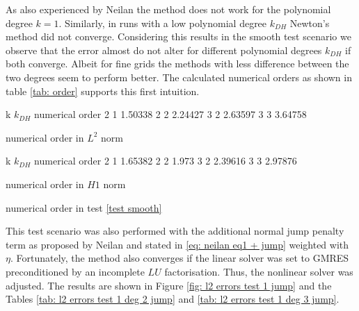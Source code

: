 As also experienced by Neilan the method does not work for the polynomial degree $k=1$. Similarly, in runs with a low polynomial degree $k_{DH}$ Newton's method did not converge.
Considering this results in the smooth test scenario we observe that the error almost do not alter for different polynomial degrees $k_{DH}$ if both converge. Albeit for fine grids the methods with less difference between the two degrees seem to perform better. The calculated numerical orders as shown in table \ref{tab: order} supports this first intuition.

\begin{table}[H]
\begin{subtable}[b]{0.45\textwidth}
\centering
	\pgfplotstabletypeset
	{
		k $k_{DH}$ {numerical order}
		2 1  1.50338
		2 2  2.24427
		3 2 2.63597
		3 3 3.64758
	}
	\caption{numerical order in $L^2$ norm}
\end{subtable}
\begin{subtable}[b]{0.45\textwidth}
	\pgfplotstabletypeset
	{
		k $k_{DH}$ {numerical order}
		2 1  1.65382 
		2 2  1.973
		3 2 2.39616
		3 3 2.97876
	}
	\caption{numerical order in $H1$ norm}
	\end{subtable}
\caption{numerical order in test \ref{test smooth}}
\label{tab: order}
\end{table}

This test scenario was also performed with the additional normal jump penalty term as proposed by Neilan and stated in \eqref{eq: neilan eq1 + jump} weighted with $\eta$. Fortunately, the method also converges if the linear solver was set to GMRES preconditioned by an incomplete $LU$ factorisation. Thus, the nonlinear solver was adjusted. The results are shown in Figure \ref{fig: l2 errors test 1 jump} and the Tables \ref{tab: l2 errors test 1 deg 2 jump} and \ref{tab: l2 errors test 1 deg 3 jump}. 


